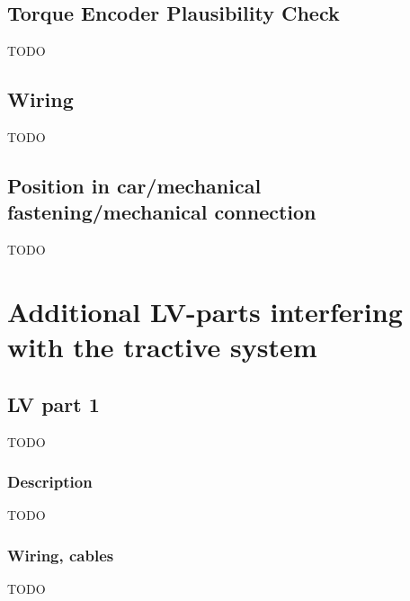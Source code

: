 \documentclass{article}
\begin{document}
\subsection{Torque Encoder Plausibility Check}\label{torque_encoder_plausibility_check}
TODO

\subsection{Wiring}
TODO

\subsection{Position in car/mechanical fastening/mechanical connection}
TODO

\section{Additional LV-parts interfering with the tractive system}
\subsection{LV part 1}
TODO

\subsubsection{Description}
TODO

\subsubsection*{Wiring, cables}
TODO
\end{document}
